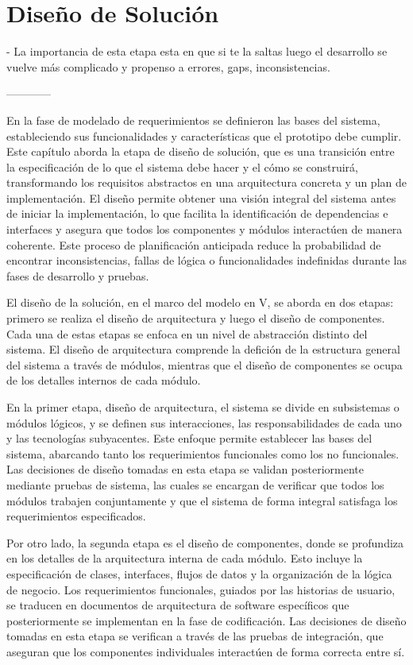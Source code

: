 \chapter[Diseño de Solución]{Diseño de Solución}
\label{cp:design}

\parindent0pt

- La importancia de esta etapa esta en que si te la saltas luego el desarrollo se vuelve más complicado y propenso a errores, gaps, inconsistencias.

------------

En la fase de modelado de requerimientos se definieron las bases del sistema, estableciendo sus funcionalidades y características que el prototipo debe cumplir. Este capítulo aborda la etapa de diseño de solución, que es una transición entre la especificación de lo que el sistema debe hacer y el cómo se construirá, transformando los requisitos abstractos en una arquitectura concreta y un plan de implementación. El diseño permite obtener una visión integral del sistema antes de iniciar la implementación, lo que facilita la identificación de dependencias e interfaces y asegura que todos los componentes y módulos interactúen de manera coherente. Este proceso de planificación anticipada reduce la probabilidad de encontrar inconsistencias, fallas de lógica o funcionalidades indefinidas durante las fases de desarrollo y pruebas.

El diseño de la solución, en el marco del modelo en V, se aborda en dos etapas: primero se realiza el diseño de arquitectura y luego el diseño de componentes. Cada una de estas etapas se enfoca en un nivel de abstracción distinto del sistema. El diseño de arquitectura comprende la defición de la estructura general del sistema a través de módulos, mientras que el diseño de componentes se ocupa de los detalles internos de cada módulo.

En la primer etapa, diseño de arquitectura, el sistema se divide en subsistemas o módulos lógicos, y se definen sus interacciones, las responsabilidades de cada uno y las tecnologías subyacentes. Este enfoque permite establecer las bases del sistema, abarcando tanto los requerimientos funcionales como los no funcionales. Las decisiones de diseño tomadas en esta etapa se validan posteriormente mediante pruebas de sistema, las cuales se encargan de verificar que todos los módulos trabajen conjuntamente y que el sistema de forma integral satisfaga los requerimientos especificados.

Por otro lado, la segunda etapa es el diseño de componentes, donde se profundiza en los detalles de la arquitectura interna de cada módulo. Esto incluye la especificación de clases, interfaces, flujos de datos y la organización de la lógica de negocio. Los requerimientos funcionales, guiados por las historias de usuario, se traducen en documentos de arquitectura de software específicos que posteriormente se implementan en la fase de codificación. Las decisiones de diseño tomadas en esta etapa se verifican a través de las pruebas de integración, que aseguran que los componentes individuales interactúen de forma correcta entre sí.

